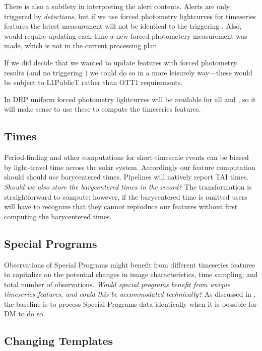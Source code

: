 \documentclass[DM,authoryear,toc]{lsstdoc}
\begin{document}
There is also a subtlety in interpreting the alert contents.
Alerts are only triggered by \DIASource \textit{detections}, but if we use forced photometry lightcurves for timeseries features the latest measurement will not be identical to the triggering \DIASource.
Also, \DIAObjects would require updating each time a new forced photometery measurement was made, which is not in the current processing plan.

If we did decide that we wanted to update \DIAObject features with forced photometry results (and no triggering \DIASource) we could do so in a more leisurely way---these would be subject to L1PublicT rather than OTT1 requirements.

In DRP uniform forced photometry lightcurves will be available for all \Objects and \DIAObjects, so it will make sense to use these to compute the timeseries features.

\subsection{Times}

Period-finding and other computations for short-timescale events can be biased by light-travel time across the solar system.
Accordingly our feature computation should should use barycentered times.  
Pipelines will natively report TAI times.
\textit{Should we also store the barycentered times in the \DIASource record?}
The transformation is straightforward to compute; however, if the barycentered time is omitted users will have to recognize that they cannot reproduce our features without first computing the barycentered times.

\subsection{Special Programs}

Observations of Special Programs might benefit from different timeseries features to capitalize on the potential changes in image characteristics, time sampling, and total number of observations.
\textit{Would special programs benefit from unique timeseries features, and could this be accommodated technically?}
As discussed in , the baseline is to process Special Programs data identically when it is possible for DM to do so. 


\subsection{Changing Templates} \label{sec:template_change}
\end{document}
